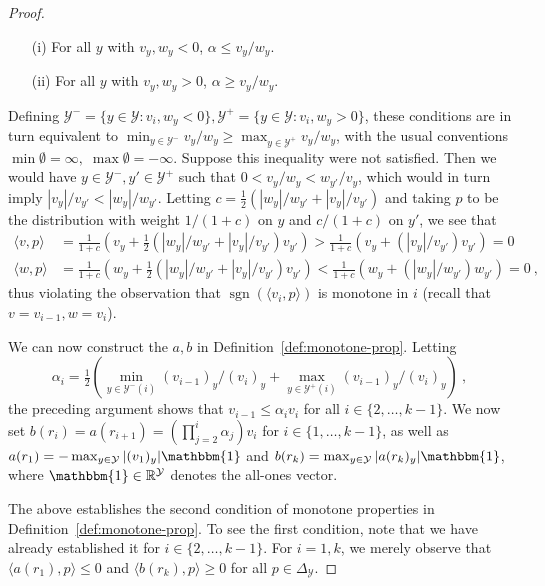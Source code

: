 \documentclass[12pt]{article}
\newcommand{\reals}{\mathbb{R}}
\newcommand{\simplex}{\Delta_\Y}
\newcommand{\Y}{\mathcal{Y}}
\newcommand{\inprod}[2]{\langle #1, #2 \rangle}%
\newcommand{\ones}{\mathbbm{1}}
\DeclareMathOperator*{\sgn}{sgn}
\begin{document}
\begin{proof}
  \begin{enumerate}
  \item[(i)] For all $y$ with $v_y,w_y < 0$, $\alpha \leq v_y/w_y$.
  \item[(ii)] For all $y$ with $v_y,w_y > 0$, $\alpha \geq v_y/w_y$.
  \end{enumerate}
  Defining $\Y^- = \{y\in\Y: v_i,w_y < 0\}, \Y^+ = \{y\in\Y: v_i,w_y > 0\}$, these conditions are in turn equivalent to $\min_{y\in\Y^-} v_y/w_y \geq \max_{y\in\Y^+} v_y/w_y$, with the usual conventions $\min \emptyset = \infty,\; \max \emptyset = -\infty$.
  Suppose this inequality were not satisfied.
  Then we would have $y \in \Y^-,y'\in\Y^+$ such that $0 < v_y/w_y < w_{y'}/v_y$, which would in turn imply $|v_y|/v_{y'} < |w_y| / w_{y'}$.
  Letting $c = \tfrac 1 2 \left(|w_y| / w_{y'} + |v_y|/v_{y'}\right)$ and taking $p$ to be the distribution with weight $1/(1+c)$ on $y$ and $c/(1+c)$ on $y'$, we see that
  \begin{align*}
    \inprod{v}{p} &= \frac 1 {1+c} \left(v_y + \tfrac 1 2 (|w_y| / w_{y'} + |v_y|/v_{y'})v_{y'}\right) > \frac 1 {1+c} \left(v_y + (|v_y|/v_{y'})v_{y'}\right) = 0
    \\
    \inprod{w}{p} &= \frac 1 {1+c} \left(w_y + \tfrac 1 2 (|w_y| / w_{y'} + |v_y|/v_{y'})v_{y'}\right) < \frac 1 {1+c} \left(w_y + (|w_y|/w_{y'})w_{y'}\right) = 0~,
  \end{align*}
  thus violating the observation that $\sgn(\inprod{v_i}{p})$ is monotone in $i$ (recall that $v = v_{i-1}, w = v_{i}$).

  We can now construct the $a,b$ in Definition~\ref{def:monotone-prop}.
  Letting
  \[\alpha_i = \tfrac 1 2 \left(\min_{y\in\Y^-(i)} (v_{i-1})_y/(v_{i})_y + \max_{y\in\Y^+(i)} (v_{i-1})_y/(v_{i})_y\right)~,\] the preceding argument shows that $v_{i-1} \leq \alpha_i v_{i}$ for all $i \in \{2,\ldots,k-1\}$.
  We now set $b(r_i) = a(r_{i+1}) = (\prod_{j=2}^i \alpha_j) v_i$ for $i\in\{1,\ldots,k-1\}$, as well as $a(r_1) = -\max_{y\in\Y} |(v_1)_y|\ones$ and $b(r_k) = \max_{y\in\Y} |a(r_k)_y|\ones$, where $\ones\in\reals^\Y$ denotes the all-ones vector.

  The above establishes the second condition of monotone properties in Definition~\ref{def:monotone-prop}.
  To see the first condition, note that we have already established it for $i\in\{2,\ldots,k-1\}$.
  For $i=1,k$, we merely observe that $\inprod{a(r_1)}{p} \leq 0$ and $\inprod{b(r_k)}{p} \geq 0$ for all $p\in\simplex$.
\end{proof}
\end{document}
